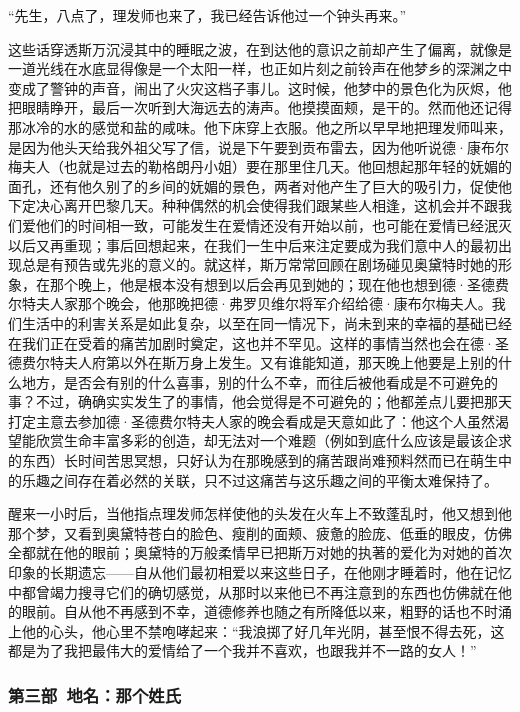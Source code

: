 \par “先生，八点了，理发师也来了，我已经告诉他过一个钟头再来。”
\par 这些话穿透斯万沉浸其中的睡眠之波，在到达他的意识之前却产生了偏离，就像是一道光线在水底显得像是一个太阳一样，也正如片刻之前铃声在他梦乡的深渊之中变成了警钟的声音，闹出了火灾这档子事儿。这时候，他梦中的景色化为灰烬，他把眼睛睁开，最后一次听到大海远去的涛声。他摸摸面颊，是干的。然而他还记得那冰冷的水的感觉和盐的咸味。他下床穿上衣服。他之所以早早地把理发师叫来，是因为他头天给我外祖父写了信，说是下午要到贡布雷去，因为他听说德·康布尔梅夫人（也就是过去的勒格朗丹小姐）要在那里住几天。他回想起那年轻的妩媚的面孔，还有他久别了的乡间的妩媚的景色，两者对他产生了巨大的吸引力，促使他下定决心离开巴黎几天。种种偶然的机会使得我们跟某些人相逢，这机会并不跟我们爱他们的时间相一致，可能发生在爱情还没有开始以前，也可能在爱情已经泯灭以后又再重现；事后回想起来，在我们一生中后来注定要成为我们意中人的最初出现总是有预告或先兆的意义的。就这样，斯万常常回顾在剧场碰见奥黛特时她的形象，在那个晚上，他是根本没有想到以后会再见到她的；现在他也想到德·圣德费尔特夫人家那个晚会，他那晚把德·弗罗贝维尔将军介绍给德·康布尔梅夫人。我们生活中的利害关系是如此复杂，以至在同一情况下，尚未到来的幸福的基础已经在我们正在受着的痛苦加剧时奠定，这也并不罕见。这样的事情当然也会在德·圣德费尔特夫人府第以外在斯万身上发生。又有谁能知道，那天晚上他要是上别的什么地方，是否会有别的什么喜事，别的什么不幸，而往后被他看成是不可避免的事？不过，确确实实发生了的事情，他会觉得是不可避免的；他都差点儿要把那天打定主意去参加德·圣德费尔特夫人家的晚会看成是天意如此了：他这个人虽然渴望能欣赏生命丰富多彩的创造，却无法对一个难题（例如到底什么应该是最该企求的东西）长时间苦思冥想，只好认为在那晚感到的痛苦跟尚难预料然而已在萌生中的乐趣之间存在着必然的关联，只不过这痛苦与这乐趣之间的平衡太难保持了。
\par 醒来一小时后，当他指点理发师怎样使他的头发在火车上不致蓬乱时，他又想到他那个梦，又看到奥黛特苍白的脸色、瘦削的面颊、疲惫的脸庞、低垂的眼皮，仿佛全都就在他的眼前；奥黛特的万般柔情早已把斯万对她的执著的爱化为对她的首次印象的长期遗忘——自从他们最初相爱以来这些日子，在他刚才睡着时，他在记忆中都曾竭力搜寻它们的确切感觉，从那时以来他已不再注意到的东西也仿佛就在他的眼前。自从他不再感到不幸，道德修养也随之有所降低以来，粗野的话也不时涌上他的心头，他心里不禁咆哮起来：“我浪掷了好几年光阴，甚至恨不得去死，这都是为了我把最伟大的爱情给了一个我并不喜欢，也跟我并不一路的女人！”

\subsubsection*{第三部\ 地名：那个姓氏}

